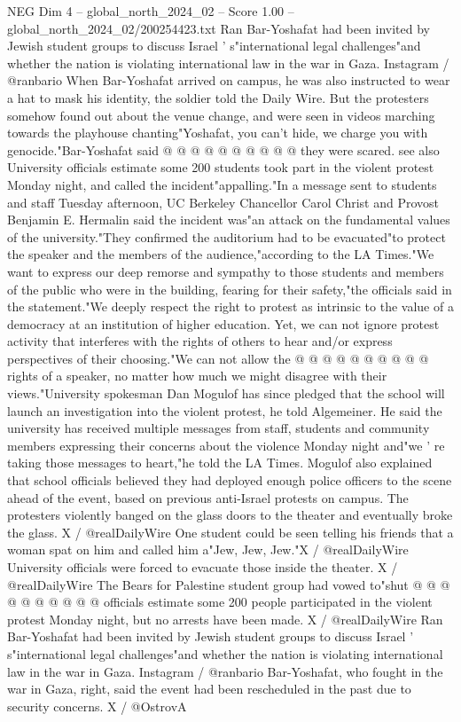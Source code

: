\begin{textsample}{NEG Dim 4 – global\_north\_2024\_02 – Score 1.00 – global\_north\_2024\_02/200254423.txt}
Ran Bar-Yoshafat had been invited by Jewish student groups to discuss Israel ' s"international legal challenges"and whether the nation is violating international law in the war in Gaza.
Instagram / @ranbario When Bar-Yoshafat arrived on campus, he was also instructed to wear a hat to mask his identity, the soldier told the Daily Wire.
But the protesters somehow found out about the venue change, and were seen in videos marching towards the playhouse chanting"Yoshafat, you can't hide, we charge you with genocide."Bar-Yoshafat said @ @ @ @ @ @ @ @ @ @ they were scared. see also University officials estimate some 200 students took part in the violent protest Monday night, and called the incident"appalling."In a message sent to students and staff Tuesday afternoon, UC Berkeley Chancellor Carol Christ and Provost Benjamin E.
Hermalin said the incident was"an attack on the fundamental values of the university."They confirmed the auditorium had to be evacuated"to protect the speaker and the members of the audience,"according to the LA Times."We want to express our deep remorse and sympathy to those students and members of the public who were in the building, fearing for their safety,"the officials said in the statement."We deeply respect the right to protest as intrinsic to the value of a democracy at an institution of higher education.
Yet, we can not ignore protest activity that interferes with the rights of others to hear and/or express perspectives of their choosing."We can not allow the @ @ @ @ @ @ @ @ @ @ rights of a speaker, no matter how much we might disagree with their views."University spokesman Dan Mogulof has since pledged that the school will launch an investigation into the violent protest, he told Algemeiner.
He said the university has received multiple messages from staff, students and community members expressing their concerns about the violence Monday night and"we ' re taking those messages to heart,"he told the LA Times.
Mogulof also explained that school officials believed they had deployed enough police officers to the scene ahead of the event, based on previous anti-Israel protests on campus.
The protesters violently banged on the glass doors to the theater and eventually broke the glass.
X / @realDailyWire One student could be seen telling his friends that a woman spat on him and called him a"Jew, Jew, Jew."X / @realDailyWire University officials were forced to evacuate those inside the theater.
X / @realDailyWire The Bears for Palestine student group had vowed to"shut @ @ @ @ @ @ @ @ @ @ officials estimate some 200 people participated in the violent protest Monday night, but no arrests have been made.
X / @realDailyWire Ran Bar-Yoshafat had been invited by Jewish student groups to discuss Israel ' s"international legal challenges"and whether the nation is violating international law in the war in Gaza.
Instagram / @ranbario Bar-Yoshafat, who fought in the war in Gaza, right, said the event had been rescheduled in the past due to security concerns.
X / @OstrovA

\end{textsample}
